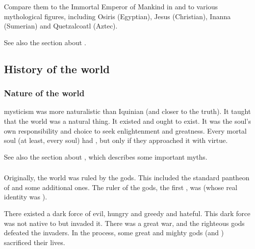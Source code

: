 Compare them to the Immortal Emperor of Mankind in \cite{RPG:Warhammer40000} and to various mythological figures, including Osiris (Egyptian), Jesus (Christian), Inanna (Sumerian) and Quetzalcoatl (Aztec). 

See also the section about . 









\subsection{History of the world}





\subsubsection{Nature of the world}
\Ortaican mysticism was more naturalistic than Iquinian (and closer to the truth). 
It taught that the world was a natural thing. 
It existed and ought to exist. 
It was the soul's own responsibility and choice to seek enlightenment and greatness. 
Every mortal soul (at least, every \scathaese soul) had , but only if they approached it with virtue.

See also the section about , which describes some important myths. 





\subsubsection{\Banes}
Originally, the world was ruled by the \Ortaican gods.
This included the standard pantheon of \Taorthae and some additional ones. 
The ruler of the gods, the first \Nechsain, was  (whose real identity was \Sethicus). 

There existed a dark force of evil, hungry and greedy and hateful. 
This dark force was not native to \Miith but invaded it. 
There was a great war, and the righteous gods defeated the invaders. 
In the process, some great and mighty gods (\Settras and \Tiamat) sacrificed their lives.

